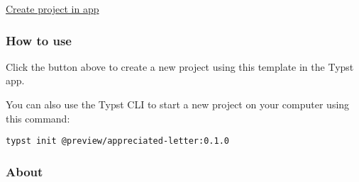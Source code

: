 \begin{Shaded}
\begin{Highlighting}[]

\NormalTok{  sender: [}
\NormalTok{  ],}
\NormalTok{  recipient: [}
\NormalTok{  ],}
\NormalTok{)}



\end{Highlighting}
\end{Shaded}

\href{/app?template=appreciated-letter&version=0.1.0}{Create project in
app}

\subsubsection{How to use}\label{how-to-use}

Click the button above to create a new project using this template in
the Typst app.

You can also use the Typst CLI to start a new project on your computer
using this command:

\begin{verbatim}
typst init @preview/appreciated-letter:0.1.0
\end{verbatim}



\subsubsection{About}\label{about}


